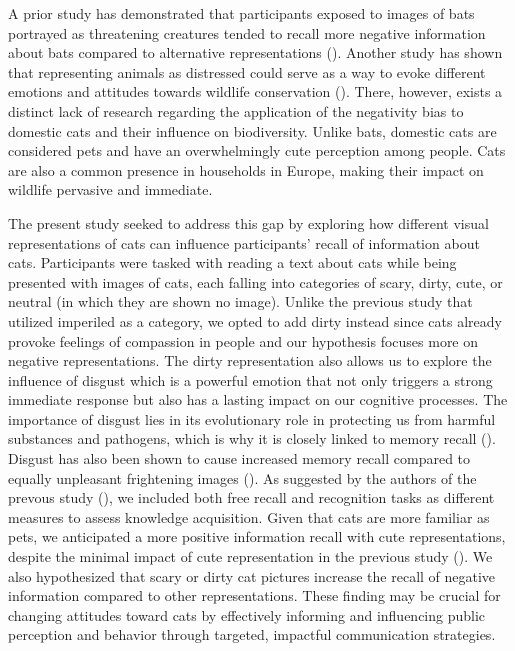 \documentclass[
  man,
  longtable,
  nolmodern,
  notxfonts,
  notimes,
  colorlinks=true,linkcolor=blue,citecolor=blue,urlcolor=blue]{apa7}
\begin{document}
A prior study has demonstrated that participants exposed to images of
bats portrayed as threatening creatures tended to recall more negative
information about bats compared to alternative representations
(). Another
study has shown that representing animals as distressed could serve as a
way to evoke different emotions and attitudes towards wildlife
conservation ().
There, however, exists a distinct lack of research regarding the
application of the negativity bias to domestic cats and their influence
on biodiversity. Unlike bats, domestic cats are considered pets and have
an overwhelmingly cute perception among people. Cats are also a common
presence in households in Europe, making their impact on wildlife
pervasive and immediate.

The present study seeked to address this gap by exploring how different
visual representations of cats can influence participants' recall of
information about cats. Participants were tasked with reading a text
about cats while being presented with images of cats, each falling into
categories of scary, dirty, cute, or neutral (in which they are shown no
image). Unlike the previous study that utilized imperiled as a category,
we opted to add dirty instead since cats already provoke feelings of
compassion in people and our hypothesis focuses more on negative
representations. The dirty representation also allows us to explore the
influence of disgust which is a powerful emotion that not only triggers
a strong immediate response but also has a lasting impact on our
cognitive processes. The importance of disgust lies in its evolutionary
role in protecting us from harmful substances and pathogens, which is
why it is closely linked to memory recall
(). Disgust has
also been shown to cause increased memory recall compared to equally
unpleasant frightening images
(). As
suggested by the authors of the prevous study
(), we
included both free recall and recognition tasks as different measures to
assess knowledge acquisition. Given that cats are more familiar as pets,
we anticipated a more positive information recall with cute
representations, despite the minimal impact of cute representation in
the previous study (). We also hypothesized that scary or dirty cat pictures
increase the recall of negative information compared to other
representations. These finding may be crucial for changing attitudes
toward cats by effectively informing and influencing public perception
and behavior through targeted, impactful communication strategies.
\end{document}
